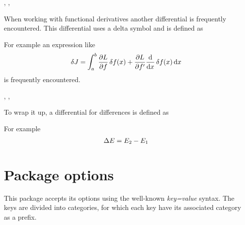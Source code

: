 	\begin{function}{\fdif}
		\begin{syntax}
			\sarg, , 
		\end{syntax}
		When working with functional derivatives another differential is frequently encountered. This differential uses a delta symbol and is defined as
		
		\begin{definition}
			\DeclareDifferential{\fdif}{\delta}%
		\end{definition}
		
		\noindent For example an expression like
		\begin{align*}
			\fdif{J} = \int_{a}^{b} \pdv{L}{f} \fdif{f(x)} + \pdv{L}{f'} \odv*{ \fdif{f(x)} }{x} \odif{x}
		\end{align*}
		is frequently encountered.
	\end{function}
	
	\begin{function}{\adif}
		\begin{syntax}
			\sarg, , \marg{variables}
		\end{syntax}
		To wrap it up, a differential for differences is defined as
		
		\begin{definition}
			\DeclareDifferential{\adif}{\Delta}%
		\end{definition}
		
		\noindent For example
		\begin{align*}
			\adif{E} = E_2 - E_1
		\end{align*}
	\end{function}
	
	\clearpage
	\section{Package options}
	This package accepts its options using the well-known \emph{key=value} syntax. The keys are divided into categories, for which each key have its associated category as a prefix. %
	
